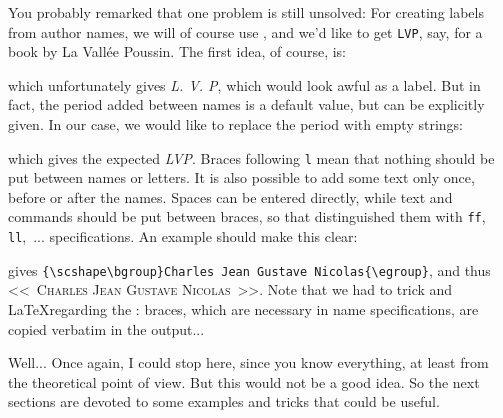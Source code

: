 You probably remarked that one problem is still unsolved: For creating
labels from author names, we will of course use , and we'd
like to get \verb+LVP+, say, for a book by 
La Vall\'ee Poussin. The first idea, of course, is:
\begin{myexv}
\end{myexv} %
\noindent 
which unfortunately gives \emph{L. V. P}, which would look awful as a label.
But in fact, the period added between names is a default value, but can be
explicitly given. In our case, we would like to replace the period with empty strings:
\begin{myexv}
\end{myexv} %
\noindent 
which gives the expected \emph{LVP}. 
Braces following \verb+l+ mean that nothing should be put between names or
letters. It is also possible to add some text only once, before or after
the names. Spaces can be entered directly, while text and commands should be
put between braces, so that \bt distinguished them with \verb+ff+,
\verb+ll+,~... specifications. An example should make this clear:
\begin{myexv}
\begin{verbatimtab}
"Charles Jean Gustave Nicolas de La Vall{\'e}e Poussin"
#1 "{{\scshape\bgroup}ff{ }{\egroup}" format.name$
\end{verbatimtab}
\end{myexv} %
\noindent gives
\verb+{\scshape\bgroup}Charles Jean Gustave Nicolas{\egroup}+, and thus
<<~{\scshape\bgroup}Charles Jean Gustave Nicolas{\egroup}~>>. 
Note that we had to trick \bt and \LaTeX regarding the : braces,
which are necessary in \bt name specifications, are copied verbatim in the
output...
\label{noms-end}

\medskip
Well... Once again, I could stop here, since you know everything, at least
from the theoretical point of view. But this would not be a good 
idea. So the next sections are devoted to some examples and tricks that could
be useful.

\clearpage
{}

